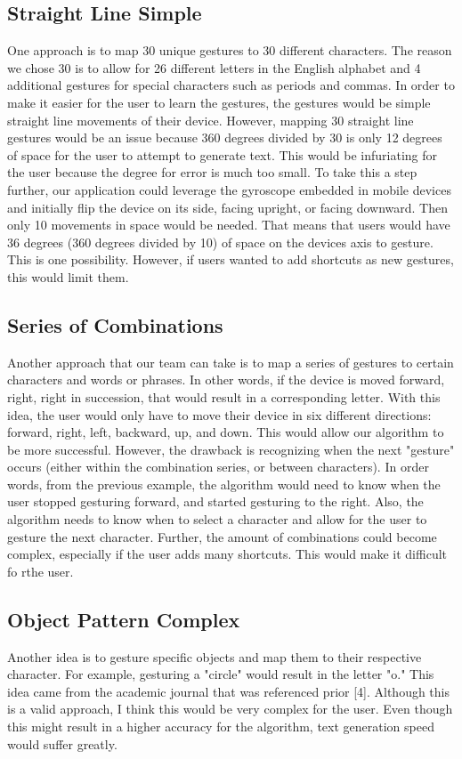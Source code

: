 \documentclass[onecolumn, draftclsnofoot,10pt, journal, letterpaper]{IEEEtran}
\begin{document}
    \subsection{Straight Line Simple}
        One approach is to map 30 unique gestures to 30 different characters. The reason we chose 30 is to allow for 26 different letters in the English alphabet and 4 additional gestures for special characters such as periods and commas. In order to make it easier for the user to learn the gestures, the gestures would be simple straight line movements of their device. However, mapping 30 straight line gestures would be an issue because 360 degrees divided by 30 is only 12 degrees of space for the user to attempt to generate text. This would be infuriating for the user because the degree for error is much too small. To take this a step further, our application could leverage the gyroscope embedded in mobile devices and initially flip the device on its side, facing upright, or facing downward. Then only 10 movements in space would be needed. That means that users would have 36 degrees (360 degrees divided by 10) of space on the devices axis to gesture. This is one possibility. However, if users wanted to add shortcuts as new gestures, this would limit them.
    
    \subsection{Series of Combinations}
        Another approach that our team can take is to map a series of gestures to certain characters and words or phrases. In other words, if the device is moved forward, right, right in succession, that would result in a corresponding letter. With this idea, the user would only have to move their device in six different directions: forward, right, left, backward, up, and down. This would allow our algorithm to be more successful. However, the drawback is recognizing when the next "gesture" occurs (either within the combination series, or between characters). In order words, from the previous example, the algorithm would need to know when the user stopped gesturing forward, and started gesturing to the right. Also, the algorithm needs to know when to select a character and allow for the user to gesture the next character. Further, the amount of combinations could become complex, especially if the user adds many shortcuts. This would make it difficult fo rthe user. 
    
    \subsection{Object Pattern Complex}
        Another idea is to gesture specific objects and map them to their respective character. For example, gesturing a "circle" would result in the letter "o." This idea came from the academic journal that was referenced prior [4]. Although this is a valid approach, I think this would be very complex for the user. Even though this might result in a higher accuracy for the algorithm, text generation speed would suffer greatly.
    
\end{document}
